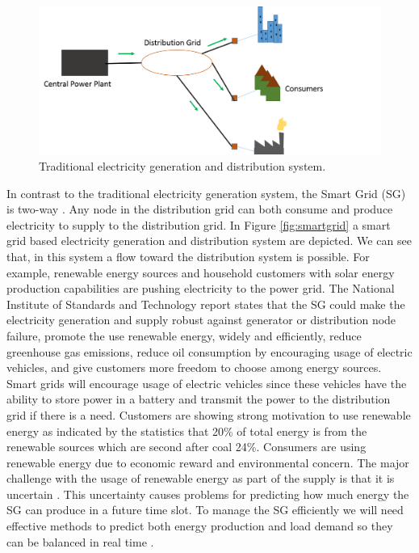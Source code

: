 \begin{figure}[h]
  \includegraphics[width=\linewidth]{traditional.png}
  \caption{Traditional electricity generation and distribution system.}
  \label{fig:tradgrid}
\end{figure}

In contrast to the traditional electricity generation system, the Smart Grid (SG) is two-way \cite{fang2012smart}. Any node in the distribution grid can both consume and produce electricity to supply to the distribution grid. In Figure \ref{fig:smartgrid} a smart grid based electricity generation and distribution system are depicted. We can see that, in this system a flow toward the distribution system is possible. For example, renewable energy sources and household customers with solar energy production capabilities are pushing electricity to the power grid. The National Institute of Standards and Technology report \cite{fang2012smart} states that the SG could make the electricity generation and supply robust against generator or distribution node failure, promote the use renewable energy, widely and efficiently, reduce greenhouse gas emissions, reduce oil consumption by encouraging usage of electric vehicles, and give customers more freedom to choose among energy sources. Smart grids will encourage usage of electric vehicles since these vehicles have the ability to store power in a battery and transmit the power to the distribution grid if there is a need. Customers are showing strong motivation to use renewable energy as indicated by the statistics that 20\% of total energy is from the renewable sources which are second after coal 24\%. Consumers are using renewable energy due to economic reward and environmental concern. The major challenge with the usage of renewable energy as part of the supply is that it is uncertain \cite{richter2012transitioning}. This uncertainty causes problems for predicting how much energy the SG can produce in a future time slot. To manage the SG efficiently we will need effective methods to predict both energy production and load demand so they can be balanced in real time \cite{potter2009building}.

